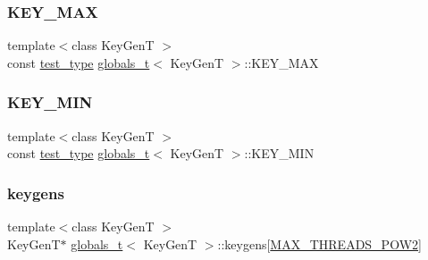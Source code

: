 \mbox{\label{structglobals__t_ad8295a990809a58e6923bed1538ccb07}} 
\subsubsection{\texorpdfstring{K\+E\+Y\+\_\+\+M\+AX}{KEY\_MAX}}
{\footnotesize\ttfamily template$<$class Key\+GenT $>$ \\
const \hyperlink{microbench_2main_8cpp_a8c96a4eb128cbef9f7b7aa2f7533202f}{test\+\_\+type} \hyperlink{structglobals__t}{globals\+\_\+t}$<$ Key\+GenT $>$\+::K\+E\+Y\+\_\+\+M\+AX}

\mbox{\label{structglobals__t_a6025a17c21db364b4d05b63db453e7c7}} 
\subsubsection{\texorpdfstring{K\+E\+Y\+\_\+\+M\+IN}{KEY\_MIN}}
{\footnotesize\ttfamily template$<$class Key\+GenT $>$ \\
const \hyperlink{microbench_2main_8cpp_a8c96a4eb128cbef9f7b7aa2f7533202f}{test\+\_\+type} \hyperlink{structglobals__t}{globals\+\_\+t}$<$ Key\+GenT $>$\+::K\+E\+Y\+\_\+\+M\+IN}

\mbox{\label{structglobals__t_a542bf0080db5994c5dca6985b37df24c}} 
\subsubsection{\texorpdfstring{keygens}{keygens}}
{\footnotesize\ttfamily template$<$class Key\+GenT $>$ \\
Key\+GenT$\ast$ \hyperlink{structglobals__t}{globals\+\_\+t}$<$ Key\+GenT $>$\+::keygens\mbox{[}\hyperlink{plaf_8h_ac1585a3455dd3e33e877e588be9e466b}{M\+A\+X\+\_\+\+T\+H\+R\+E\+A\+D\+S\+\_\+\+P\+O\+W2}\mbox{]}}

\mbox{\label{structglobals__t_a38304d0125e69f6142752f3274343976}} 
